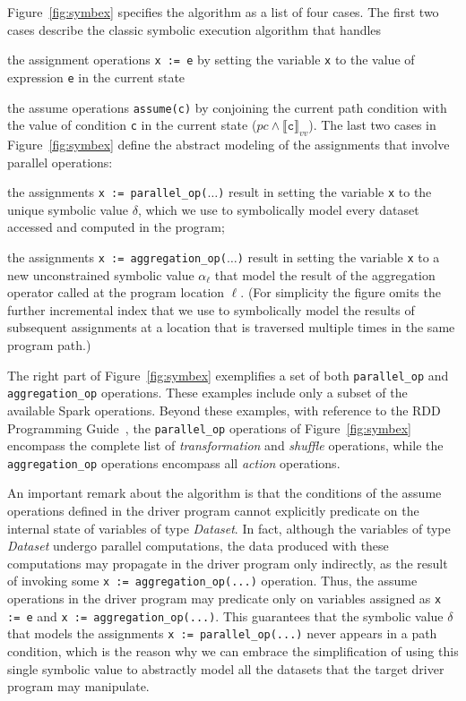 Figure~\ref{fig:symbex} specifies the algorithm as a list of four cases. The first two cases describe the classic symbolic execution algorithm that handles 
\begin{inparaenum}[(i)]
	\item the assignment operations  \texttt{x := e} by setting the variable \texttt{x} to the value of expression \texttt{e} in the current state %
	\item the assume operations \texttt{assume(c)} by conjoining the current path condition with the value of condition \texttt{c} in the current state ($pc \wedge \llbracket \texttt{c}\rrbracket_{vv}$). 
	The last two cases in Figure~\ref{fig:symbex} define the abstract modeling of the assignments that involve parallel operations:  
	\item the assignments \texttt{x~:= parallel\_op($\dots$)} result in setting the variable \texttt{x} to the unique symbolic value $\delta$, which we use to symbolically model every dataset accessed and computed in the program; \item the assignments \texttt{x := aggregation\_op($\dots$)} result in setting the variable \texttt{x} to a new unconstrained symbolic value $\alpha_\ell$ that model the result of the aggregation operator called at the program location $\ell$.  (For simplicity the figure omits the further incremental index that we use to symbolically model the results of subsequent assignments at a location that is traversed multiple times in the same program path.)
\end{inparaenum}

The right part of Figure~\ref{fig:symbex} exemplifies a set of both \texttt{parallel\_op} and \texttt{aggregation\_op} operations. These examples include only a subset of the available Spark operations. Beyond these examples, with reference to the RDD Programming Guide~\cite{RDDGuide:online:2019}, the  \texttt{parallel\_op} operations of Figure~\ref{fig:symbex} encompass the complete list of \emph{transformation} and \emph{shuffle} operations, while the  \texttt{aggregation\_op} operations encompass all \emph{action} operations. 

An important remark about the algorithm is that the conditions of the assume operations defined in the driver program cannot explicitly predicate on the internal state of variables of type \emph{Dataset}. In fact, although the variables of type \emph{Dataset} undergo parallel computations, the data produced with these computations may propagate in the driver program only indirectly, as the result of invoking some \texttt{x := aggregation\_op(...)} operation. Thus, the assume operations in the driver program may predicate only on variables assigned as \texttt{x := e} and \texttt{x := aggregation\_op(...)}. 
This guarantees that the symbolic value $\delta$ that models the assignments \texttt{x~:= parallel\_op(...)} never appears in a path condition, which is the reason why we can embrace the simplification of using this single symbolic value to abstractly model all the datasets that the target driver program may manipulate. 


